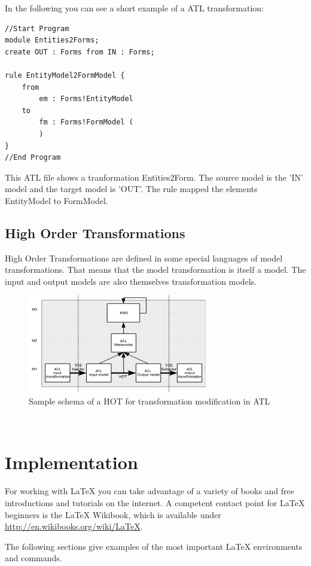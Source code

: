 \documentclass{llncs}
\begin{document}
In the following you can see a short example of a ATL transformation:
\begin{verbatim}
//Start Program
module Entities2Forms;
create OUT : Forms from IN : Forms;

rule EntityModel2FormModel {
	from
		em : Forms!EntityModel
	to 
		fm : Forms!FormModel (
		)
}
//End Program
\end{verbatim}

This ATL file shows a tranformation Entities2Form. The source model is the 'IN'
model and the target model is 'OUT'. The rule mapped the elements EntityModel to
FormModel. 


\subsection{High Order Transformations}
High Order Transformations are defined in some special languages of model
transformations. That means that the model transformation is itself a model. The
input and output models are also themselves transformation models. 

\begin{figure}[tb]
	\centering
	\includegraphics[width=0.7\textwidth,natwidth=610,natheight=642]{figures/HOT.png}
	\caption{Sample schema of a HOT for transformation modification in ATL}
	\label{fig:samplefigure_pdf}
\end{figure}~\cite{misc:ModelingLanguages}

\section{Implementation}

For working with LaTeX you can take advantage of a variety of books and free introductions and tutorials on the internet. A competent contact point for LaTeX beginners is the LaTeX Wikibook, which is available under \url{http://en.wikibooks.org/wiki/LaTeX}. 

The following sections give examples of the most important LaTeX environments and commands.
\end{document}
